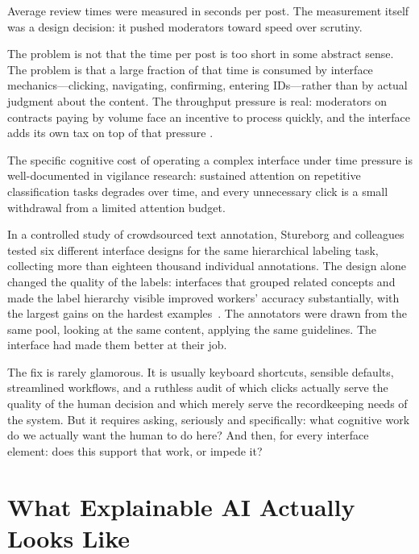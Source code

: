 Average review times were measured in seconds per post. The measurement itself was a design decision: it pushed moderators toward speed over scrutiny.

The problem is not that the time per post is too short in some abstract sense. The problem is that a large fraction of that time is consumed by interface mechanics---clicking, navigating, confirming, entering IDs---rather than by actual judgment about the content. The throughput pressure is real: moderators on contracts paying by volume face an incentive to process quickly, and the interface adds its own tax on top of that pressure \autocite{stureborg2023interface}. 

The specific cognitive cost of operating a complex interface under time pressure is well-documented in vigilance research: sustained attention on repetitive classification tasks degrades over time, and every unnecessary click is a small withdrawal from a limited attention budget.

\begin{examplebox}
In a controlled study of crowdsourced text annotation, Stureborg and colleagues tested six different interface designs for the same hierarchical labeling task, collecting more than eighteen thousand individual annotations. The design alone changed the quality of the labels: interfaces that grouped related concepts and made the label hierarchy visible improved workers' accuracy substantially, with the largest gains on the hardest examples~\autocite{stureborg2023interface}. The annotators were drawn from the same pool, looking at the same content, applying the same guidelines. The interface had made them better at their job.
\end{examplebox}

The fix is rarely glamorous. It is usually keyboard shortcuts, sensible defaults, streamlined workflows, and a ruthless audit of which clicks actually serve the quality of the human decision and which merely serve the recordkeeping needs of the system. But it requires asking, seriously and specifically: what cognitive work do we actually want the human to do here? And then, for every interface element: does this support that work, or impede it?

\section{What Explainable AI Actually Looks Like}
\label{sec:ch6-xai}

